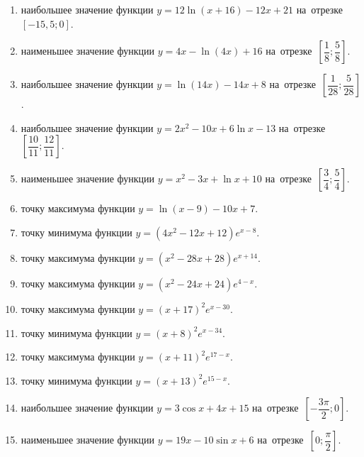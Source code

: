 \documentclass[a4paper,10pt]{article}
\begin{document}
\begin{enumerate}
\item {} наибольшее значение функции $y = 12\ln \left(x+16\right)-12x +21$ на~отрезке~$\left[-15,5;0\right]$.

\item {} наименьшее значение функции $y = 4x-\ln \left(4x\right)+16$ на~отрезке~$\left[\dfrac{1}{8};\dfrac{5}{8}\right]$.

\item {} наибольшее значение функции $y = \ln \left(14x\right)-14x+8$ на~отрезке~$\left[\dfrac{1}{28};\dfrac{5}{28}\right]$.

\item {} наибольшее значение функции $y=2x^2-10x+6\ln x-13$ на~отрезке~$\left[\dfrac{10}{11};\dfrac{12}{11}\right]$.

\item {} наименьшее значение функции $y=x^2-3x+\ln x+10$ на~отрезке~$\left[\dfrac{3}{4};\dfrac{5}{4}\right]$.

\item {} точку максимума функции $y=\ln \left(x-9\right)-10x+7$.

\item {} точку минимума функции $y=\left(4x^2-12x+12\right)e^{x-8}$.

\item {} точку максимума функции $y=\left(x^2-28x+28\right)e^{x+14}$.

\item {} точку максимума функции $y=\left(x^2-24x+24\right)e^{4-x}$.

\item {} точку максимума функции $y=\left(x +17\right)^2e^{x-30}$.

\item {} точку минимума функции $y=\left(x +8\right)^2e^{x-34}$.

\item {} точку максимума функции $y=\left(x +11\right)^2e^{17-x}$.

\item {} точку минимума функции $y=\left(x +13\right)^2e^{15-x}$.

\item {} наибольшее значение функции $y=3\cos x+4x +15$ на~отрезке~$\left[-\dfrac{3\pi }{2};0\right]$.

\item {} наименьшее значение функции $y=19x-10\sin x +6$ на~отрезке~$\left[0;\dfrac{\pi }{2}\right]$.


\end{enumerate}
\end{document}
